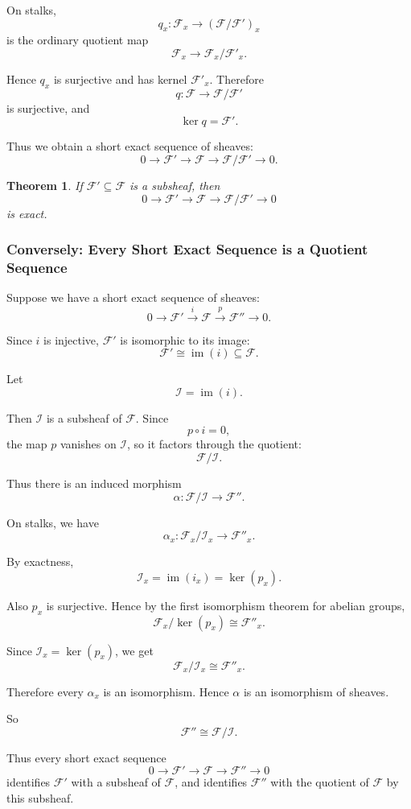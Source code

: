 \documentclass[12pt,a4paper]{article}
\DeclareMathOperator{\im}{im}
\newcommand{\F}{\mathcal F}
\theoremstyle{notespace}
\newtheorem{theorem}[definition]{Theorem}
\newcommand{\Fp}{\mathcal F'}      %
\newcommand{\Fpp}{\mathcal F''}
\begin{document}
On stalks,
\[
q_x:\F_x\to (\F/\Fp)_x
\]
is the ordinary quotient map
\[
\F_x\to \F_x/\Fp_x.
\]

Hence \(q_x\) is surjective and has kernel \(\Fp_x\). Therefore
\[
q:\F\to \F/\Fp
\]
is surjective, and
\[
\ker q=\Fp.
\]

Thus we obtain a short exact sequence of sheaves:
\[
0\longrightarrow \Fp
\longrightarrow \F
\longrightarrow \F/\Fp
\longrightarrow 0.
\]

\begin{theorem}
	If \(\Fp\subseteq \F\) is a subsheaf, then
	\[
	0\longrightarrow \Fp
	\longrightarrow \F
	\longrightarrow \F/\Fp
	\longrightarrow 0
	\]
	is exact.
\end{theorem}

\subsubsection{Conversely: Every Short Exact Sequence is a Quotient Sequence}

Suppose we have a short exact sequence of sheaves:
\[
0\longrightarrow \Fp
\xrightarrow{i}
\F
\xrightarrow{p}
\Fpp
\longrightarrow 0.
\]

Since \(i\) is injective, \(\Fp\) is isomorphic to its image:
\[
\Fp\cong \im(i)\subseteq \F.
\]

Let
\[
\mathcal I=\im(i).
\]

Then \(\mathcal I\) is a subsheaf of \(\F\). Since
\[
p\circ i=0,
\]
the map \(p\) vanishes on \(\mathcal I\), so it factors through the quotient:
\[
\F/\mathcal I.
\]

Thus there is an induced morphism
\[
\alpha:\F/\mathcal I\to \Fpp.
\]

On stalks, we have
\[
\alpha_x:\F_x/\mathcal I_x\to \Fpp_x.
\]

By exactness,
\[
\mathcal I_x=\im(i_x)=\ker(p_x).
\]

Also \(p_x\) is surjective. Hence by the first isomorphism theorem for abelian groups,
\[
\F_x/\ker(p_x)\cong \Fpp_x.
\]

Since \(\mathcal I_x=\ker(p_x)\), we get
\[
\F_x/\mathcal I_x\cong \Fpp_x.
\]

Therefore every \(\alpha_x\) is an isomorphism. Hence \(\alpha\) is an isomorphism of sheaves.

So
\[
\Fpp\cong \F/\mathcal I.
\]

Thus every short exact sequence
\[
0\to \Fp\to \F\to \Fpp\to 0
\]
identifies \(\Fp\) with a subsheaf of \(\F\), and identifies \(\Fpp\) with the quotient of \(\F\) by this subsheaf.
\end{document}

